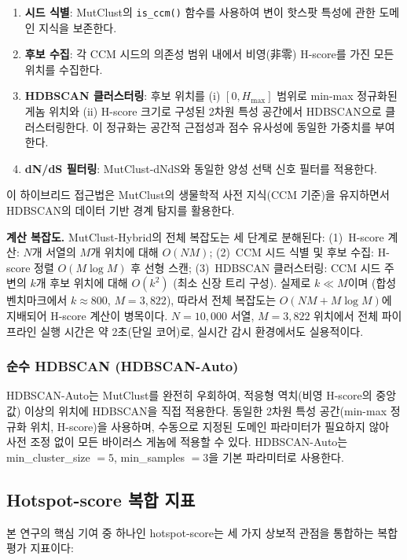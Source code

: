 \begin{enumerate}
\item \textbf{시드 식별}: MutClust의 \texttt{is\_ccm()} 함수를 사용하여 변이 핫스팟 특성에 관한 도메인 지식을 보존한다.
\item \textbf{후보 수집}: 각 CCM 시드의 의존성 범위 내에서 비영(非零) H-score를 가진 모든 위치를 수집한다.
\item \textbf{HDBSCAN 클러스터링}: 후보 위치를 (i) $[0, H_{\max}]$ 범위로 min-max 정규화된 게놈 위치와 (ii) H-score 크기로 구성된 2차원 특성 공간에서 HDBSCAN으로 클러스터링한다. 이 정규화는 공간적 근접성과 점수 유사성에 동일한 가중치를 부여한다.
\item \textbf{dN/dS 필터링}: MutClust-dNdS와 동일한 양성 선택 신호 필터를 적용한다.
\end{enumerate}

이 하이브리드 접근법은 MutClust의 생물학적 사전 지식(CCM 기준)을 유지하면서 HDBSCAN의 데이터 기반 경계 탐지를 활용한다.

\textbf{계산 복잡도.}
MutClust-Hybrid의 전체 복잡도는 세 단계로 분해된다:
(1)~H-score 계산: $N$개 서열의 $M$개 위치에 대해 $O(NM)$;
(2)~CCM 시드 식별 및 후보 수집: H-score 정렬 $O(M \log M)$ 후 선형 스캔;
(3)~HDBSCAN 클러스터링: CCM 시드 주변의 $k$개 후보 위치에 대해 $O(k^2)$ (최소 신장 트리 구성).
실제로 $k \ll M$이며 (합성 벤치마크에서 $k \approx 800$, $M = 3{,}822$), 따라서 전체 복잡도는 $O(NM + M \log M)$에 지배되어 H-score 계산이 병목이다.
$N = 10{,}000$ 서열, $M = 3{,}822$ 위치에서 전체 파이프라인 실행 시간은 약 2초(단일 코어)로, 실시간 감시 환경에서도 실용적이다.

\subsubsection{순수 HDBSCAN (HDBSCAN-Auto)}

HDBSCAN-Auto는 MutClust를 완전히 우회하여, 적응형 역치(비영 H-score의 중앙값) 이상의 위치에 HDBSCAN을 직접 적용한다.
동일한 2차원 특성 공간(min-max 정규화 위치, H-score)을 사용하며, 수동으로 지정된 도메인 파라미터가 필요하지 않아 사전 조정 없이 모든 바이러스 게놈에 적용할 수 있다.
HDBSCAN-Auto는 min\_cluster\_size $= 5$, min\_samples $= 3$을 기본 파라미터로 사용한다.

\subsection{Hotspot-score 복합 지표}
\label{subsec:hotspot_score}

본 연구의 핵심 기여 중 하나인 hotspot-score는 세 가지 상보적 관점을 통합하는 복합 평가 지표이다:

